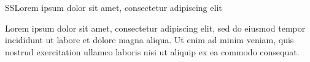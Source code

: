 \begin{section}{SS}{Lorem ipsum dolor sit amet, consectetur adipiscing elit}
  \begin{minipage}{\linewidth}
    \strut {\small Lorem ipsum dolor sit amet, consectetur adipiscing elit, sed
      do eiusmod tempor incididunt ut labore et dolore magna aliqua. Ut enim ad
      minim veniam, quis nostrud exercitation ullamco laboris nisi ut aliquip ex
      ea commodo consequat.}
  \end{minipage}
\end{section}